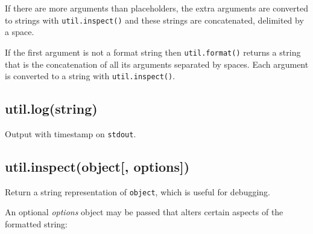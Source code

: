 If there are more arguments than placeholders, the extra arguments are
converted to strings with \texttt{util.inspect()} and these strings are
concatenated, delimited by a space.

\begin{Shaded}
\end{Shaded}

If the first argument is not a format string then \texttt{util.format()}
returns a string that is the concatenation of all its arguments
separated by spaces. Each argument is converted to a string with
\texttt{util.inspect()}.

\begin{Shaded}
\begin{Highlighting}[]
\NormalTok{(}\NormalTok{, }\NormalTok{, }\NormalTok{); }
\end{Highlighting}
\end{Shaded}

\subsection{util.log(string)}\label{util.logstring}

Output with timestamp on \texttt{stdout}.

\begin{Shaded}
\begin{Highlighting}[]
\NormalTok{(}\NormalTok{(}\NormalTok{);}
\end{Highlighting}
\end{Shaded}

\subsection{util.inspect(object{[},
options{]})}\label{util.inspectobject-options}

Return a string representation of \texttt{object}, which is useful for
debugging.

An optional \emph{options} object may be passed that alters certain
aspects of the formatted string:

